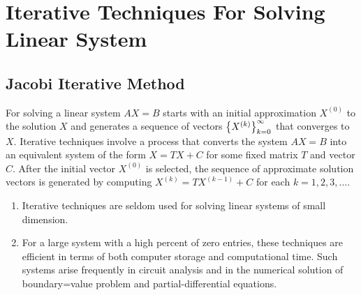 \documentclass[../main-sheet.tex]{subfiles}
\begin{document}
\section{Iterative Techniques For Solving Linear System}
\subsection{Jacobi Iterative Method}
For solving a linear system \(AX=B\) starts with an initial approximation \(X^{(0)}\) to the solution \(X\) and generates a sequence of vectors \(\left\{X^{(k)}\right\}_{k=0}^\infty\) that converges to \(X\). Iterative techniques involve a process that converts the system \(AX=B\) into an equivalent system of the form \(X=TX+C\) for some fixed matrix \(T\) and vector \(C\). After the initial vector \(X^{(0)}\) is selected, the sequence of approximate solution vectors is generated by computing \(X^{(k)}=TX^{(k-1)}+C\) for each \(k=1,2,3,\dots\).
\begin{note}
    \begin{enumerate}
        \item Iterative techniques are seldom used for solving linear systems of small dimension.
        \item For a large system with a high percent of zero entries, these techniques are efficient in terms of both computer storage and computational time. Such systems arise frequently in circuit analysis and in the numerical solution of boundary=value problem and partial-differential equations.
    \end{enumerate}
\end{note}
\end{document}
